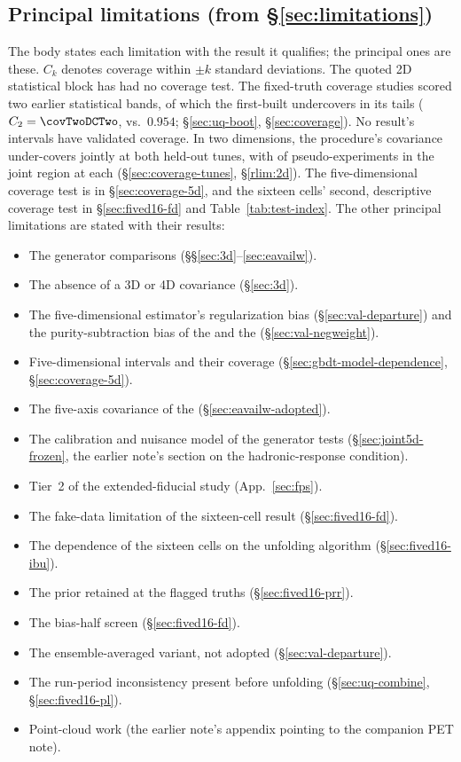 \subsection{Principal limitations (from \S\ref{sec:limitations})}
The body states each limitation with the result it qualifies; the principal ones are these. $C_k$ denotes coverage within $\pm k$ standard deviations.
The quoted 2D statistical block has had no coverage test. The fixed-truth coverage studies scored two earlier statistical bands, of which the first-built undercovers in its tails ($C_2=\covTwoDCTwo$, vs.\ $0.954$; \S\ref{sec:uq-boot}, \S\ref{sec:coverage}).
No result's intervals have validated coverage. In two dimensions, the procedure's covariance under-covers jointly at both held-out tunes, with  of  pseudo-experiments in the joint region at each (\S\ref{sec:coverage-tunes}, \S\ref{rlim:2d}). The five-dimensional coverage test is in \S\ref{sec:coverage-5d}, and the sixteen cells' second, descriptive coverage test in \S\ref{sec:fived16-fd} and Table~\ref{tab:test-index}.
The other principal limitations are stated with their results:
\begin{itemize}
\item The generator comparisons (\S\S\ref{sec:3d}--\ref{sec:eavailw}).
\item The absence of a 3D or 4D covariance (\S\ref{sec:3d}).
\item The five-dimensional estimator's regularization bias (\S\ref{sec:val-departure}) and the purity-subtraction bias of the \estPurity{} and the \estDetPurity{} (\S\ref{sec:val-negweight}).
\item Five-dimensional intervals and their coverage (\S\ref{sec:gbdt-model-dependence}, \S\ref{sec:coverage-5d}).
\item The five-axis covariance of the \resFiveAxis{} (\S\ref{sec:eavailw-adopted}).
\item The calibration and nuisance model of the generator tests (\S\ref{sec:joint5d-frozen}, the earlier note's section on the hadronic-response condition).
\item Tier~2 of the extended-fiducial study (App.~\ref{sec:fps}).
\item The fake-data limitation of the sixteen-cell result (\S\ref{sec:fived16-fd}).
\item The dependence of the sixteen cells on the unfolding algorithm (\S\ref{sec:fived16-ibu}).
\item The prior retained at the flagged truths (\S\ref{sec:fived16-prr}).
\item The bias-half screen (\S\ref{sec:fived16-fd}).
\item The ensemble-averaged variant, not adopted (\S\ref{sec:val-departure}).
\item The run-period inconsistency present before unfolding (\S\ref{sec:uq-combine}, \S\ref{sec:fived16-pl}).
\item Point-cloud work (the earlier note's appendix pointing to the companion PET note).
\end{itemize}
